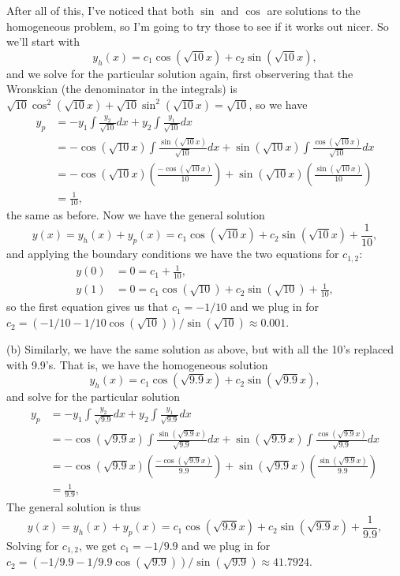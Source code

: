 \documentclass[11pt]{article}
\def\f{\frac }
\begin{document}
\begin{enumerate}
After all of this, I've noticed that both $\sin$ and $\cos$ are solutions to the homogeneous problem, so I'm going to try those to see if it works out nicer.
So we'll start with 
\[ y_h (x) = c_1 \cos (\sqrt{10} x) + c_2 \sin (\sqrt{10} x),\]
and we solve for the particular solution again, first observering that the Wronskian (the denominator in the integrals) is $\sqrt{10} \cos ^2 (\sqrt{10} x) + \sqrt{10} \sin ^2 (\sqrt{10} x) = \sqrt{10}$, so we have 
\begin{align*} y_p &= -y_1 \int \f{y_2}{\sqrt{10}}dx +y_2 \int \f{y_1}{\sqrt{10}}dx\\
&= -\cos (\sqrt{10} x) \int \f{\sin(\sqrt{10}x)}{\sqrt{10}}dx +\sin(\sqrt{10}x) \int \f{\cos (\sqrt{10} x)}{\sqrt{10}}dx\\
&= -\cos (\sqrt{10} x) \left ( \f{-\cos(\sqrt{10}x)}{10} \right )  +\sin(\sqrt{10}x) \left (  \f{\sin (\sqrt{10} x)}{10} \right ) \\
&= \f{1}{10}, \end{align*}
the same as before.
Now we have the general solution 
\[ y(x) = y_h (x) + y_p (x) = c_1 \cos (\sqrt{10} x) + c_2 \sin (\sqrt{10} x) + \f{1}{10},\]
and applying the boundary conditions we have the two equations for $c_{1,2}$:
\begin{align*} y(0) &= 0 = c_1 + \f{1}{10},\\
y(1) &= 0 = c_1 \cos (\sqrt{10}) + c_2 \sin (\sqrt{10}) + \f{1}{10},\end{align*}
so the first equation gives us that $c_1 = -1/10$ and we plug in for $c_2 = (-1/10-1/10\cos(\sqrt{10}))/\sin(\sqrt{10}) \approx 0.001$.

(b) Similarly, we have the same solution as above, but with all the 10's replaced with 9.9's.
That is, we have the homogeneous solution
\[ y_h (x) = c_1 \cos (\sqrt{9.9} x) + c_2 \sin (\sqrt{9.9} x),\]
and solve for the particular solution
\begin{align*} y_p &= -y_1 \int \f{y_2}{\sqrt{9.9}}dx +y_2 \int \f{y_1}{\sqrt{9.9}}dx\\
&= -\cos (\sqrt{9.9} x) \int \f{\sin(\sqrt{9.9}x)}{\sqrt{9.9}}dx +\sin(\sqrt{9.9}x) \int \f{\cos (\sqrt{9.9} x)}{\sqrt{9.9}}dx\\
&= -\cos (\sqrt{9.9} x) \left ( \f{-\cos(\sqrt{9.9}x)}{9.9} \right )  +\sin(\sqrt{9.9}x) \left (  \f{\sin (\sqrt{9.9} x)}{9.9} \right ) \\
&= \f{1}{9.9}, \end{align*}
The general solution is thus
\[ y(x) = y_h (x) + y_p (x) = c_1 \cos (\sqrt{9.9} x) + c_2 \sin (\sqrt{9.9} x) + \f{1}{9.9},\]
Solving for $c_{1,2}$, we get $c_1 = -1/9.9$ and we plug in for $c_2 = (-1/9.9-1/9.9\cos(\sqrt{9.9}))/\sin(\sqrt{9.9}) \approx 41.7924$.


\end{enumerate}
\end{document}
